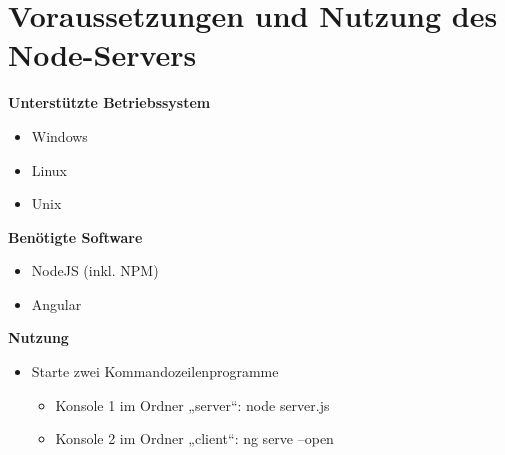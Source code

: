 \section{Voraussetzungen und Nutzung des Node-Servers}
\textbf{Unterstützte Betriebssystem}
\begin{itemize}
    \item Windows
    \item Linux
    \item Unix
\end{itemize} 
\textbf{Benötigte Software}
\begin{itemize}
    \item NodeJS (inkl. NPM)
    \item Angular
\end{itemize} 
\textbf{Nutzung}
\begin{itemize}
    \item Starte zwei Kommandozeilenprogramme
    \begin{itemize}
        \item Konsole 1 im Ordner „server“: node server.js 
        \item Konsole 2 im Ordner „client“: ng serve --open 
    \end{itemize}
\end{itemize} 
\newpage
